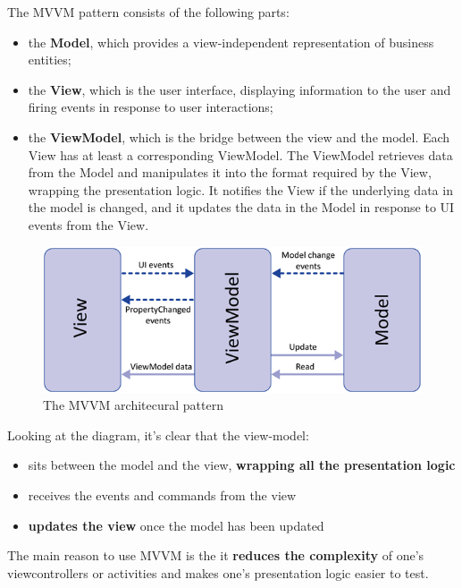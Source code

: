 The MVVM pattern consists of the following parts:

\begin{itemize}
\itemsep1pt\parskip0pt
\item
  the \textbf{Model}, which provides a view-independent representation
  of business entities;
\item
  the \textbf{View}, which is the user interface, displaying information
  to the user and firing events in response to user interactions;
\item
  the \textbf{ViewModel}, which is the bridge between the view and the
  model. Each View has at least a corresponding ViewModel. The ViewModel
  retrieves data from the Model and manipulates it into the format
  required by the View, wrapping the presentation logic. It notifies the
  View if the underlying data in the model is changed, and it updates
  the data in the Model in response to UI events from the View.
\end{itemize}

\begin{figure}[htbp]
\centering
\includegraphics[scale=0.75]{imgs/mvvm.png}
\caption{The MVVM architecural pattern}
\end{figure}

Looking at the diagram, it's clear that the view-model:

\begin{itemize}
\itemsep1pt\parskip0pt
\item
  sits between the model and the view, \textbf{wrapping all the
  presentation logic}
\item
  receives the events and commands from the view
\item
  \textbf{updates the view} once the model has been updated
\end{itemize}

The main reason to use MVVM is the it \textbf{reduces the complexity} of
one's viewcontrollers or activities and makes one's presentation logic
easier to test.

